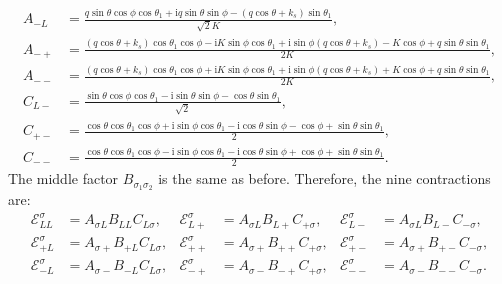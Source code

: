 \documentclass[a4paper,12pt]{article}
\def\ii{\mathrm{i}}
\def\si{\sigma}
\begin{document}
\begin{align}
    A_{-L}
    &=\frac{q\sin\theta\cos\phi\cos\theta_1
    +\ii q\sin\theta\sin\phi
    -(q\cos\theta+k_s)\sin\theta_1}{\sqrt{2}K}, \nonumber \\
    A_{-+}
    &=\frac{(q\cos\theta+k_s)\cos\theta_1\cos\phi
    - \ii K \sin\phi\cos\theta_1
    + \ii \sin\phi (q\cos\theta+k_s)
    - K \cos\phi
    + q \sin\theta\sin\theta_1}
    {2K}, \nonumber \\
    A_{--}
    &=\frac{(q\cos\theta+k_s)\cos\theta_1\cos\phi
    + \ii K \sin\phi\cos\theta_1
    + \ii \sin\phi (q\cos\theta+k_s)
    + K \cos\phi
    + q \sin\theta\sin\theta_1}
    {2K}, \nonumber \\
    C_{L-}
    &=\frac{\sin\theta\cos\phi\cos\theta_1
    -\ii\sin\theta\sin\phi
    -\cos\theta\sin\theta_1}
    {\sqrt{2}}, \nonumber \\
    C_{+-}
    &=\frac{\cos\theta\cos\theta_1\cos\phi
    + \ii \sin\phi \cos\theta_1
    - \ii \cos\theta\sin\phi
    - \cos\phi
    + \sin\theta\sin\theta_1}
    {2}, \nonumber \\
    C_{--}
    &=\frac{\cos\theta\cos\theta_1\cos\phi
    - \ii \sin\phi \cos\theta_1
    - \ii \cos\theta\sin\phi
    + \cos\phi
    + \sin\theta\sin\theta_1}
    {2}.
\end{align}
The middle factor $B_{\si_1\si_2}$ is the same as before. Therefore, the nine contractions are:
\begin{align}
    \mathcal{E}^{\sigma}_{LL} &= A_{\si L} B_{LL} C_{L\si}, &
    \mathcal{E}^{\si}_{L+} &= A_{\si L} B_{L+} C_{+\si}, &
    \mathcal{E}^{\si}_{L-} &= A_{\si L} B_{L-} C_{-\si}, \\
    \mathcal{E}^{\si}_{+L} &= A_{\si +} B_{+L} C_{L\si}, &
    \mathcal{E}^{\si}_{++} &= A_{\si +} B_{++} C_{+\si}, &
    \mathcal{E}^{\si}_{+-} &= A_{\si +} B_{+-} C_{-\si}, \\
    \mathcal{E}^{\si}_{-L} &= A_{\si -} B_{-L} C_{L\si}, &
    \mathcal{E}^{\si}_{-+} &= A_{\si -} B_{-+} C_{+\si}, &
    \mathcal{E}^{\si}_{--} &= A_{\si -} B_{--} C_{-\si}.
\end{align}
\end{document}
